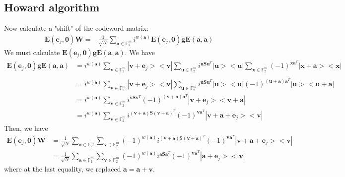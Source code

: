 \documentclass{article}
\begin{document}
	\subsection*{Howard algorithm}
	Now calculate a "shift" of the codeword matrix:
	\begin{align*}
		\mathbf{E}(\mathbf{e}_j, \mathbf{0})\mathbf{W} = &\frac{1}{\sqrt{N}} \sum_{\mathbf{a} \in \mathbb{F}^m_2} i^{w(\mathbf{a})}\mathbf{E}(\mathbf{e}_j,\mathbf{0})\mathbf{g}\mathbf{E}(\mathbf{a},\mathbf{a}) 
	\end{align*}
	We must calculate $\mathbf{E}(\mathbf{e}_j,\mathbf{0})\mathbf{g}\mathbf{E}(\mathbf{a},\mathbf{a})$. We have
	\begin{align*}
	\mathbf{E}(\mathbf{e}_j,\mathbf{0})\mathbf{g}\mathbf{E}(\mathbf{a},\mathbf{a})& = 	i^{w(\mathbf{a})}  \sum_{\mathbf{v} \in \mathbb{F}_2^m}{ |\mathbf{v}+\mathbf{e}_j><\mathbf{v}|}  \sum_{\mathbf{u} \in \mathbb{F}_2^m}{i^{\mathbf{u S}\mathbf{u}^T} |\mathbf{u}><\mathbf{u}|}\sum_{\mathbf{x} \in \mathbb{F}_2^m}{ (-1)^{\mathbf{x}\mathbf{a}^T}|\mathbf{x+a}><\mathbf{x}|} \\
	\\
	&= i^{w(\mathbf{a})}  \sum_{\mathbf{v} \in \mathbb{F}_2^m}{ |\mathbf{v}+\mathbf{e}_j><\mathbf{v}|}  \sum_{\mathbf{u} \in \mathbb{F}_2^m}{i^{\mathbf{u S}\mathbf{u}^T} |\mathbf{u}><\mathbf{u}|} (-1)^{(\mathbf{u+a})\mathbf{a}^T}|\mathbf{u}><\mathbf{u+a}| \\
	&= i^{w(\mathbf{a})} \sum_{\mathbf{v} \in \mathbb{F}_2^m}{i^{\mathbf{v}\mathbf{S}\mathbf{v}^T}(-1)^{(\mathbf{v+a})\mathbf{a}^T} |\mathbf{v}+\mathbf{e}_j><\mathbf{v+a}|} \\
	& = i^{w(\mathbf{a})} \sum_{\mathbf{v} \in \mathbb{F}_2^m}{i^{(\mathbf{v+a})\mathbf{S}(\mathbf{v+a})^T}(-1)^{\mathbf{v}\mathbf{a}^T} |\mathbf{v+a}+\mathbf{e}_j><\mathbf{v}|}
	\end{align*}
Then, we have
\begin{align*}
	\mathbf{E}(\mathbf{e}_j, \mathbf{0})\mathbf{W} &= \frac{1}{\sqrt{N}}  \sum_{\mathbf{a} \in \mathbb{F}_2^m}{\sum_{\mathbf{v} \in \mathbb{F}_2^m}{ (-1)^{w(\mathbf{a})} i^{(\mathbf{v+a})\mathbf{S}(\mathbf{v+a})^T}(-1)^{\mathbf{v}\mathbf{a}^T} |\mathbf{v+a}+\mathbf{e}_j><\mathbf{v}|}}\\
	& = \frac{1}{\sqrt{N}}  \sum_{\mathbf{a} \in \mathbb{F}_2^m}{\sum_{\mathbf{v} \in \mathbb{F}_2^m}{ (-1)^{w(\mathbf{a})} i^{\mathbf{a}\mathbf{S}\mathbf{a}^T}(-1)^{\mathbf{v}\mathbf{a}^T} |\mathbf{a}+\mathbf{e}_j><\mathbf{v}|}}
\end{align*}
where at the last equality, we replaced $\mathbf{a=a+v}$. 
	
\end{document}
